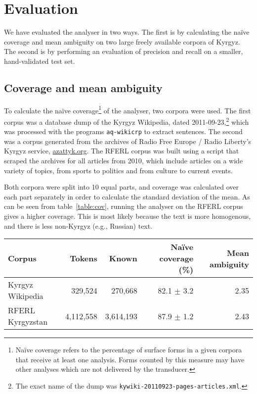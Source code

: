 \documentclass[10pt,a4paper,twocolumn]{article}
\begin{document}
\section{Evaluation}

We have evaluated the analyser in two ways. The first is by calculating the naïve coverage and mean ambiguity 
on two large freely available corpora of Kyrgyz. The second is by performing an evaluation of precision and recall on a smaller, hand-validated test set.

\subsection{Coverage and mean ambiguity}

To calculate the naïve coverage\footnote{Naïve coverage refers to the percentage of surface forms in a given corpora that receive at least one analysis.  Forms counted by this measure may have other analyses which are not delivered by the transducer.} of the analyser, two corpora were used.  The first corpus was a database dump of the Kyrgyz Wikipedia, dated 2011-09-23,\footnote{The exact name of the dump was \texttt{kywiki-20110923-pages-articles.xml}.} which was processed with the programs \texttt{aq-wikicrp} to extract sentences. The second was a corpus generated from the archives of Radio Free Europe / Radio Liberty's Kyrgyz service, \href{http://www.azattyk.org}{azattyk.org}.  The RFERL corpus was built using a script that scraped the archives for all articles from 2010, which include articles on a wide variety of topics, from sports to politics and from culture to current events.

Both corpora were split into 10 equal parts, and coverage was calculated over each part separately in order to calculate the standard deviation of the mean. As can be seen from table~\ref{table:cov}, running the analyser on the RFERL corpus gives a higher coverage.  This is most likely because the text is more homogenous, and there is less non-Kyrgyz (e.g., Russian) text.

\begin{table*}[htbp]
	\centering
	\begin{tabular}{lrrrr}
		\toprule
		Corpus           & Tokens    & Known       & Naïve coverage (\%) & Mean ambiguity\\
		\midrule 
		Kyrgyz Wikipedia & 329,524   & 270,668     & 82.1 $\pm$ 3.2      & 2.35\\
		RFERL Kyrgyzstan & 4,112,558 & 3,614,193   & 87.9 $\pm$ 1.2      & 2.43\\
		\bottomrule
	\end{tabular}
	\caption{Naïve coverage and mean ambiguity of the analyser over two test corpora.}
	\label{table:cov}
\end{table*}
\end{document}
